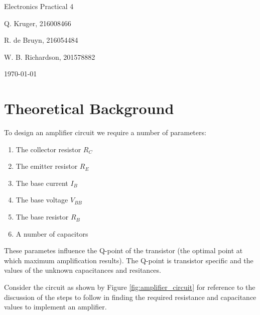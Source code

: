 \documentclass[12pt, a4paper]{article}
\begin{document}
		\begin{titlepage}
			\centering
			{\LARGE Electronics Practical 4 \par}
			\vspace*{1.5cm}
			{\large Q. Kruger, 216008466 \par}
			{\large R. de Bruyn, 216054484 \par}
			{\large W. B. Richardson, 201578882 \par}
			\vspace*{1.2cm}
			{\large \today}
			\vspace*{\fill}
			\vspace*{\fill}
		\end{titlepage}
		\tableofcontents
		\listoffigures
		\newpage
	\section{Theoretical Background} %
	\label{sub:theoretical_background}
	To design an amplifier circuit we require a number of parameters:
	\begin{enumerate}
	 	\item The collector resistor $R_C$
	 	\item The emitter resistor $R_E$
	 	\item The base current $I_B$
	 	\item The base voltage $V_{BB}$
	 	\item The base resistor $R_B$
	 	\item A number of capacitors
	\end{enumerate}

	These parametes influence the Q-point of the transistor (the optimal point at which maximum amplification results). The Q-point is transistor specific and the values of the unknown capacitances and resitances.

	Consider the circuit as shown by Figure \ref{fig:amplifier_circuit} for reference to the discussion of the steps to follow in finding the required resistance and capacitance values to implement an amplifier.
\end{document}
